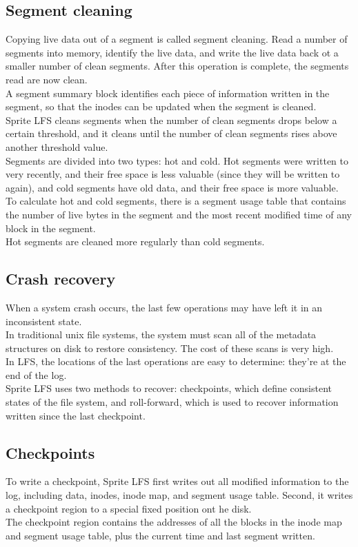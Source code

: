 \subsection{Segment cleaning}
Copying live data out of a segment is called segment cleaning. Read a number of segments into memory, identify the live data, and write the live data back ot a smaller number of clean segments. After this operation is complete, the segments read are now clean. \\
A segment summary block identifies each piece of information written in the segment, so that the inodes can be updated when the segment is cleaned.\\
Sprite LFS cleans segments when the number of clean segments drops below a certain threshold, and it cleans until the number of clean segments rises above another threshold value.\\
Segments are divided into two types: hot and cold. Hot segments were written to very recently, and their free space is less valuable (since they will be written to again), and cold segments have old data, and their free space is more valuable. \\
To calculate hot and cold segments, there is a segment usage table that contains the number of live bytes in the segment and the most recent modified time of any block in the segment. \\
Hot segments are cleaned more regularly than cold segments.
\subsection{Crash recovery}
When a system crash occurs, the last few operations may have left it in an inconsistent state.\\
In traditional unix file systems, the system must scan all of the metadata structures on disk to restore consistency. The cost of these scans is very high.\\
In LFS, the locations of the last operations are easy to determine: they're at the end of the log.\\
Sprite LFS uses two methods to recover: checkpoints, which define consistent states of the file system, and roll-forward, which is used to recover information written since the last checkpoint.
\subsection{Checkpoints}
To write a checkpoint, Sprite LFS first writes out all modified information to the log, including data, inodes, inode map, and segment usage table. Second, it writes a checkpoint region to a special fixed position ont he disk. \\
The checkpoint region contains the addresses of all the blocks in the inode map and segment usage table, plus the current time and last segment written.
